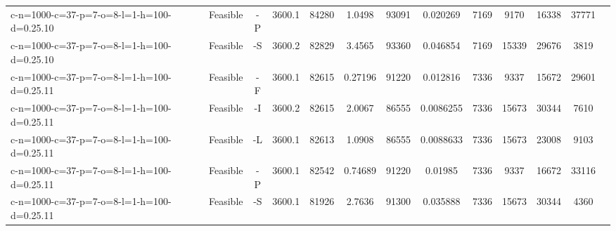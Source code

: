 \documentclass[landscape, a4paper]{article}
\begin{document}
\begin{center}
\begin{tabular}{lcccccccccccc}
c-n=1000-c=37-p=7-o=8-l=1-h=100-d=0.25.10 & Feasible & -P & 3600.1 & 84280 & 1.0498 & 93091 & 0.020269 & 7169 & 9170 & 16338 & 37771 & \\
c-n=1000-c=37-p=7-o=8-l=1-h=100-d=0.25.10 & Feasible & -S & 3600.2 & 82829 & 3.4565 & 93360 & 0.046854 & 7169 & 15339 & 29676 & 3819 & \\
c-n=1000-c=37-p=7-o=8-l=1-h=100-d=0.25.11 & Feasible & -F & 3600.1 & 82615 & 0.27196 & 91220 & 0.012816 & 7336 & 9337 & 15672 & 29601 & \\
c-n=1000-c=37-p=7-o=8-l=1-h=100-d=0.25.11 & Feasible & -I & 3600.2 & 82615 & 2.0067 & 86555 & 0.0086255 & 7336 & 15673 & 30344 & 7610 & \\
c-n=1000-c=37-p=7-o=8-l=1-h=100-d=0.25.11 & Feasible & -L & 3600.1 & 82613 & 1.0908 & 86555 & 0.0088633 & 7336 & 15673 & 23008 & 9103 & \\
c-n=1000-c=37-p=7-o=8-l=1-h=100-d=0.25.11 & Feasible & -P & 3600.1 & 82542 & 0.74689 & 91220 & 0.01985 & 7336 & 9337 & 16672 & 33116 & \\
c-n=1000-c=37-p=7-o=8-l=1-h=100-d=0.25.11 & Feasible & -S & 3600.1 & 81926 & 2.7636 & 91300 & 0.035888 & 7336 & 15673 & 30344 & 4360 & \\
\end{tabular}
\end{center}
\end{document}
